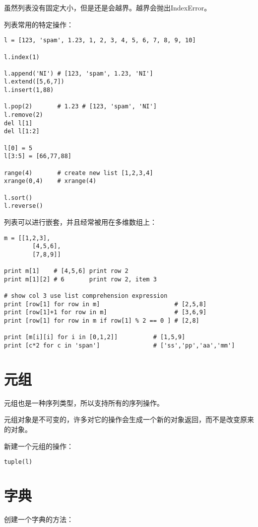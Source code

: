 虽然列表没有固定大小，但是还是会越界。越界会抛出IndexError。

列表常用的特定操作：

\begin{lstlisting}
l = [123, 'spam', 1.23, 1, 2, 3, 4, 5, 6, 7, 8, 9, 10]

l.index(1)

l.append('NI') # [123, 'spam', 1.23, 'NI']
l.extend([5,6,7])
l.insert(1,88)

l.pop(2)       # 1.23 # [123, 'spam', 'NI']
l.remove(2)
del l[1]
del l[1:2]

l[0] = 5
l[3:5] = [66,77,88]

range(4)       # create new list [1,2,3,4]
xrange(0,4)    # xrange(4)

l.sort()
l.reverse()
\end{lstlisting}

列表可以进行嵌套，并且经常被用在多维数组上：

\begin{lstlisting}
m = [[1,2,3], 
		[4,5,6], 
		[7,8,9]]

print m[1]    # [4,5,6] print row 2 
print m[1][2] # 6       print row 2, item 3

# show col 3 use list comprehension expression
print [row[1] for row in m]                     # [2,5,8]
print [row[1]+1 for row in m]                   # [3,6,9]
print [row[1] for row in m if row[1] % 2 == 0 ] # [2,8]

print [m[i][i] for i in [0,1,2]]          # [1,5,9]
print [c*2 for c in 'span']               # ['ss','pp','aa','mm']
\end{lstlisting}

\section{元组}

元组也是一种序列类型，所以支持所有的序列操作。

元组对象是不可变的，许多对它的操作会生成一个新的对象返回，而不是改变原来的对象。

新建一个元组的操作：

\begin{lstlisting}
tuple(l)
\end{lstlisting}

\section{字典}

创建一个字典的方法：


